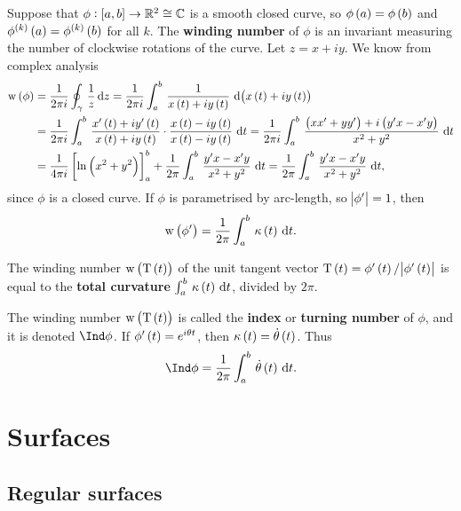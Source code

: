 Suppose that $ \phi : \sbr{a, b} \to \RR^2 \cong \CC $ is a smooth closed curve, so $ \phi\br{a} = \phi\br{b} $ and $ \phi^{\br{k}}\br{a} = \phi^{\br{k}}\br{b} $ for all $ k $. The \textbf{winding number} of $ \phi $ is an invariant measuring the number of clockwise rotations of the curve. Let $ z = x + iy $. We know from complex analysis
\begin{align*}
\w\br{\phi}
& = \dfrac{1}{2\pi i} \oint_\gamma \, \dfrac{1}{z} \, \d z
= \dfrac{1}{2\pi i} \intd{a}{b}{\dfrac{1}{x\br{t} + iy\br{t}}}{\br{x\br{t} + iy\br{t}}} \\
& = \dfrac{1}{2\pi i} \intd{a}{b}{\dfrac{x'\br{t} + iy'\br{t}}{x\br{t} + iy\br{t}} \cdot \dfrac{x\br{t} - iy\br{t}}{x\br{t} - iy\br{t}}}{t}
= \dfrac{1}{2\pi i} \intd{a}{b}{\dfrac{\br{xx' + yy'} + i\br{y'x - x'y}}{x^2 + y^2}}{t} \\
& = \dfrac{1}{4\pi i} \sbr{\ln\br{x^2 + y^2}}_a^b + \dfrac{1}{2\pi} \intd{a}{b}{\dfrac{y'x - x'y}{x^2 + y^2}}{t}
= \dfrac{1}{2\pi} \intd{a}{b}{\dfrac{y'x - x'y}{x^2 + y^2}}{t},
\end{align*}
since $ \phi $ is a closed curve. If $ \phi $ is parametrised by arc-length, so $ \abs{\phi'} = 1 $, then
$$ \w\br{\phi'} = \dfrac{1}{2\pi} \intd{a}{b}{\kappa\br{t}}{t}. $$

\begin{proposition}
The winding number $ \w\br{\T\br{t}} $ of the unit tangent vector $ \T\br{t} = \phi'\br{t} / \abs{\phi'\br{t}} $ is equal to the \textbf{total curvature} $ \intd{a}{b}{\kappa\br{t}}{t} $, divided by $ 2\pi $.
\end{proposition}

\begin{definition}
The winding number $ \w\br{\T\br{t}} $ is called the \textbf{index} or \textbf{turning number} of $ \phi $, and it is denoted $ \Ind \phi $. If $ \phi'\br{t} = e^{i\theta t} $, then $ \kappa\br{t} = \dot{\theta}\br{t} $. Thus
$$ \Ind \phi = \dfrac{1}{2\pi}\intd{a}{b}{\dot{\theta}\br{t}}{t}. $$
\end{definition}


\pagebreak

\section{Surfaces}


\subsection{Regular surfaces}

